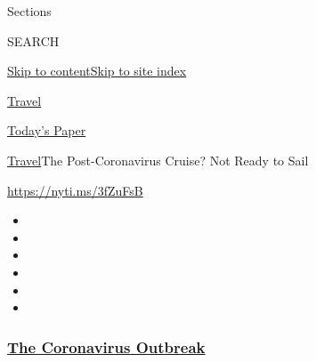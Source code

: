 Sections

SEARCH

\protect\hyperlink{site-content}{Skip to
content}\protect\hyperlink{site-index}{Skip to site index}

\href{https://www.nytimes3xbfgragh.onion/section/travel}{Travel}

\href{https://myaccount.nytimes3xbfgragh.onion/auth/login?response_type=cookie\&client_id=vi}{}

\href{https://www.nytimes3xbfgragh.onion/section/todayspaper}{Today's
Paper}

\href{/section/travel}{Travel}\textbar{}The Post-Coronavirus Cruise? Not
Ready to Sail

\url{https://nyti.ms/3fZuFsB}

\begin{itemize}
\item
\item
\item
\item
\item
\item
\end{itemize}

\hypertarget{the-coronavirus-outbreak}{%
\subsubsection{\texorpdfstring{\href{https://www.nytimes3xbfgragh.onion/news-event/coronavirus?name=styln-coronavirus-national\&region=TOP_BANNER\&variant=undefined\&block=storyline_menu_recirc\&action=click\&pgtype=Article\&impression_id=32182f30-e386-11ea-941b-313b39d5e3bc}{The
Coronavirus
Outbreak}}{The Coronavirus Outbreak}}\label{the-coronavirus-outbreak}}

